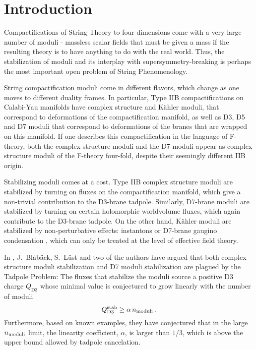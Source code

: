 \documentclass[a4paper,12pt]{article}
\numberwithin{equation}{section}
\newcommand{\be}{\begin{equation}}
\newcommand{\ee}{\end{equation}}
\begin{document}
\tableofcontents
\pagebreak

\section{Introduction}

Compactifications of String Theory to four dimensions come with a very large number of moduli - massless scalar fields that must be given a mass if the resulting theory is to have anything to do with the real world. Thus, the stabilization of moduli and its interplay with supersymmetry-breaking is perhaps the most important open problem of String Phenomenology.

String compactification moduli come in different flavors, which change as one moves to different duality frames. In particular, Type IIB compactifications on Calabi-Yau manifolds have complex structure and K\"ahler moduli, that correspond to deformations of the compactification manifold, as well as D3, D5 and D7 moduli that correspond to deformations of the branes that are wrapped on this manifold. If one describes this compactification in the language of F-theory, both the complex structure moduli and the D7 moduli appear as complex structure moduli of the F-theory four-fold, despite their seemingly different IIB origin.

Stabilizing moduli comes at a cost. Type IIB complex structure moduli are stabilized by turning on fluxes on the compactification manifold, which give a non-trivial contribution to the D3-brane tadpole. Similarly, D7-brane moduli are stabilized by turning on certain holomorphic worldvolume fluxes, which again contribute to the D3-brane tadpole. On the other hand, K\"ahler moduli are stabilized by non-perturbative effects: instantons or D7-brane gaugino condensation \cite{Kachru:2003aw}, which can only be treated at the level of effective field theory. 

In \cite{Bena:2020xrh,Bena:2021wyr}, J.~Bl{\aa}b{\"a}ck, S.~L\"ust and two of the authors have argued that both complex structure moduli stabilization and D7 moduli stabilization are plagued by the Tadpole Problem: The fluxes that stabilize the moduli source a positive D3 charge $Q_\mathrm{D3}$ whose minimal value is conjectured to grow linearly with the number of moduli
\be
Q_{\rm D3}^{\rm stab} \ge \alpha \, n_{\rm moduli}\, \nonumber .
\label{tadpole}
\ee
Furthermore, based on known examples, they have conjectured that in the large $n_{\rm moduli}$ limit, the linearity coefficient, $\alpha$, is larger than $1/3$, which is above the upper bound allowed by tadpole cancelation.
\end{document}
